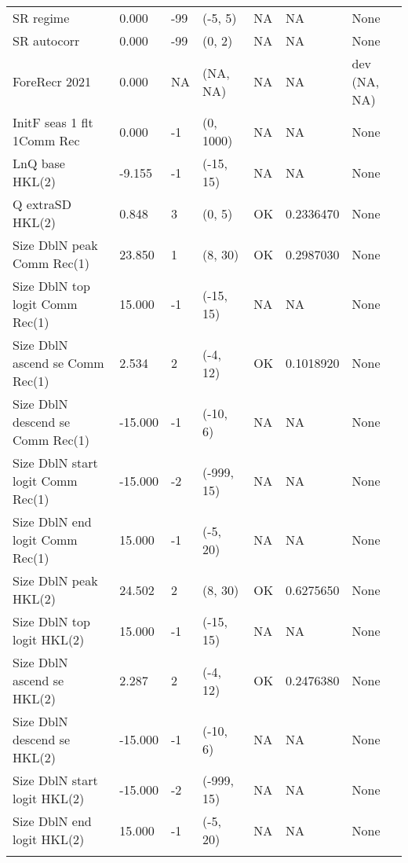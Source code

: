\documentclass[11pt,
  english,
  a4paper,
]{article}
\begin{document}
\begin{landscape}
\begin{longtable}[t]{>{\raggedright\arraybackslash}p{6cm}lllll>{\raggedright\arraybackslash}p{4cm}}
SR regime & 0.000 & -99 & (-5, 5) & NA & NA & None\\
SR autocorr & 0.000 & -99 & (0, 2) & NA & NA & None\\
ForeRecr 2021 & 0.000 & NA & (NA, NA) & NA & NA & dev (NA, NA)\\
InitF seas 1 flt 1Comm Rec & 0.000 & -1 & (0, 1000) & NA & NA & None\\
LnQ base HKL(2) & -9.155 & -1 & (-15, 15) & NA & NA & None\\
Q extraSD HKL(2) & 0.848 & 3 & (0, 5) & OK & 0.2336470 & None\\
Size DblN peak Comm Rec(1) & 23.850 & 1 & (8, 30) & OK & 0.2987030 & None\\
Size DblN top logit Comm Rec(1) & 15.000 & -1 & (-15, 15) & NA & NA & None\\
Size DblN ascend se Comm Rec(1) & 2.534 & 2 & (-4, 12) & OK & 0.1018920 & None\\
Size DblN descend se Comm Rec(1) & -15.000 & -1 & (-10, 6) & NA & NA & None\\
Size DblN start logit Comm Rec(1) & -15.000 & -2 & (-999, 15) & NA & NA & None\\
Size DblN end logit Comm Rec(1) & 15.000 & -1 & (-5, 20) & NA & NA & None\\
Size DblN peak HKL(2) & 24.502 & 2 & (8, 30) & OK & 0.6275650 & None\\
Size DblN top logit HKL(2) & 15.000 & -1 & (-15, 15) & NA & NA & None\\
Size DblN ascend se HKL(2) & 2.287 & 2 & (-4, 12) & OK & 0.2476380 & None\\
Size DblN descend se HKL(2) & -15.000 & -1 & (-10, 6) & NA & NA & None\\
Size DblN start logit HKL(2) & -15.000 & -2 & (-999, 15) & NA & NA & None\\
Size DblN end logit HKL(2) & 15.000 & -1 & (-5, 20) & NA & NA & None\\*
\end{longtable}
\endgroup{}
\end{landscape}
\endgroup{}





\newpage






\end{document}
